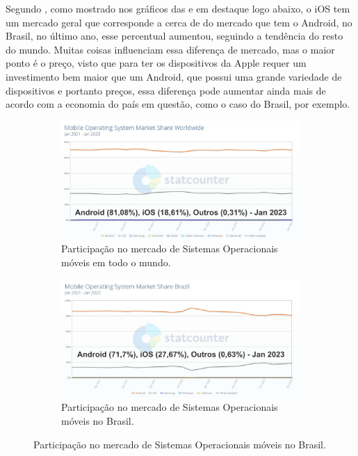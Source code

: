Segundo \cite{stats2020mobile}, como mostrado nos gráficos das  e  em destaque logo abaixo, o iOS tem um mercado geral que corresponde a cerca de  do mercado que tem o Android, no Brasil, no último ano, esse percentual aumentou, seguindo a tendência do resto do mundo. Muitas coisas influenciam essa diferença de mercado, mas o maior ponto é o preço, visto que para ter os dispositivos da Apple requer um investimento bem maior que um Android, que possui uma grande variedade de dispositivos e portanto preços, essa diferença pode aumentar ainda mais de acordo com a economia do país em questão, como o caso do Brasil, por exemplo.

\begin{figure}[H]
\centering
\begin{subfigure}{\textwidth}
   \includegraphics[width=1\linewidth]{images/mobile_operating_system_market_share_w.pdf}
   \caption{Participação no mercado de Sistemas Operacionais móveis em todo o mundo.}
   \label{fig:mobile_operating_system_market_share_w} 
\end{subfigure}

\begin{subfigure}{\textwidth}
   \includegraphics[width=1\linewidth]{images/mobile_operating_system_market_share_br.pdf}
   \caption{Participação no mercado de Sistemas Operacionais móveis no Brasil.}
   \label{fig:mobile_operating_system_market_share_br}
\end{subfigure}
\end{figure}

